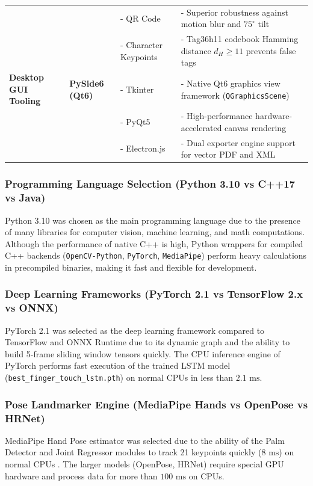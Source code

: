 \begin{table}[htbp]
{\begin{tabular}{l l l l}
 & & - QR Code & - Superior robustness against motion blur and $75^\circ$ tilt \\
 & & - Character Keypoints & - Tag36h11 codebook Hamming distance $d_H \ge 11$ prevents false tags \\
\midrule
\textbf{Desktop GUI Tooling} & \textbf{PySide6 (Qt6)} & - Tkinter & - Native Qt6 graphics view framework (\texttt{QGraphicsScene}) \\
 & & - PyQt5 & - High-performance hardware-accelerated canvas rendering \\
 & & - Electron.js & - Dual exporter engine support for vector PDF and XML \\
\bottomrule
\end{tabular}%
}
\end{table}

\subsubsection{Programming Language Selection (Python 3.10 vs C++17 vs Java)}
Python 3.10 was chosen as the main programming language due to the presence of many libraries for computer vision, machine learning, and math computations. Although the performance of native C++ is high, Python wrappers for compiled C++ backends (\texttt{OpenCV-Python}, \texttt{PyTorch}, \texttt{MediaPipe}) perform heavy calculations in precompiled binaries, making it fast and flexible for development.

\subsubsection{Deep Learning Frameworks (PyTorch 2.1 vs TensorFlow 2.x vs ONNX)}
PyTorch 2.1 was selected as the deep learning framework compared to TensorFlow and ONNX Runtime due to its dynamic graph and the ability to build 5-frame sliding window tensors quickly. The CPU inference engine of PyTorch performs fast execution of the trained LSTM model (\texttt{best\_finger\_touch\_lstm.pth}) on normal CPUs in less than $2.1\text{ ms}$.

\subsubsection{Pose Landmarker Engine (MediaPipe Hands vs OpenPose vs HRNet)}
MediaPipe Hand Pose estimator was selected due to the ability of the Palm Detector and Joint Regressor modules to track 21 keypoints quickly ($8\text{ ms}$) on normal CPUs \cite{Zhang2020MediaPipe}. The larger models (OpenPose, HRNet) require special GPU hardware and process data for more than $100\text{ ms}$ on CPUs.

